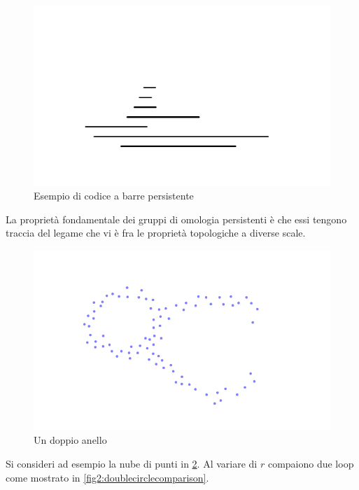 \begin{figure}[h]
  \begin{center}
    \includegraphics[width=.5\linewidth]{gfx/barcodes_multiple.pdf}
    \caption{Esempio di codice a barre persistente}
    \label{fig:typicalbarcode}
  \end{center}
\end{figure}

La proprietà fondamentale dei gruppi di omologia persistenti è che essi tengono traccia del legame che vi è fra le proprietà topologiche a diverse scale.

\begin{figure}[ht]
  \begin{center}
    \includegraphics{gfx/double_circle_small.pdf}
    \caption{Un doppio anello}
    \label{fig2:doublecircle}
  \end{center}
\end{figure}

Si consideri ad esempio la nube di punti in \cref{fig2:doublecircle}. Al variare di $r$ compaiono due loop come mostrato in \cref{fig2:doublecirclecomparison}.

